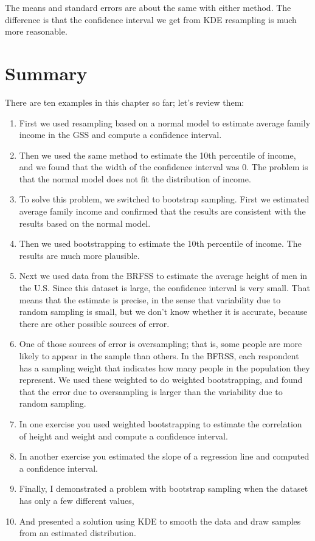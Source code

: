 The means and standard errors are about the same with either method. The
difference is that the confidence interval we get from KDE resampling is
much more reasonable.

\hypertarget{summary}{%
\section{Summary}\label{summary}}

There are ten examples in this chapter so far; let's review them:

\begin{enumerate}
\def\labelenumi{\arabic{enumi}.}
\item
  First we used resampling based on a normal model to estimate average
  family income in the GSS and compute a confidence interval.
\item
  Then we used the same method to estimate the 10th percentile of
  income, and we found that the width of the confidence interval was 0.
  The problem is that the normal model does not fit the distribution of
  income.
\item
  To solve this problem, we switched to bootstrap sampling. First we
  estimated average family income and confirmed that the results are
  consistent with the results based on the normal model.
\item
  Then we used bootstrapping to estimate the 10th percentile of income.
  The results are much more plausible.
\item
  Next we used data from the BRFSS to estimate the average height of men
  in the U.S. Since this dataset is large, the confidence interval is
  very small. That means that the estimate is precise, in the sense that
  variability due to random sampling is small, but we don't know whether
  it is accurate, because there are other possible sources of error.
\item
  One of those sources of error is oversampling; that is, some people
  are more likely to appear in the sample than others. In the BFRSS,
  each respondent has a sampling weight that indicates how many people
  in the population they represent. We used these weighted to do
  weighted bootstrapping, and found that the error due to oversampling
  is larger than the variability due to random sampling.
\item
  In one exercise you used weighted bootstrapping to estimate the
  correlation of height and weight and compute a confidence interval.
\item
  In another exercise you estimated the slope of a regression line and
  computed a confidence interval.
\item
  Finally, I demonstrated a problem with bootstrap sampling when the
  dataset has only a few different values,
\item
  And presented a solution using KDE to smooth the data and draw samples
  from an estimated distribution.
\end{enumerate}

